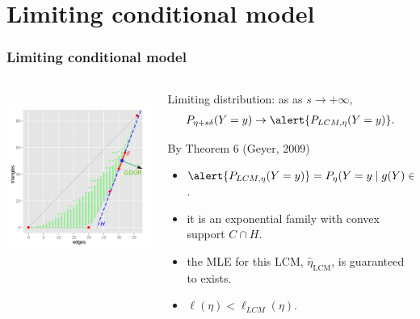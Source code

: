 \documentclass[ 10pt]{beamer}
\newcommand{\etaLCM}{\hat{\eta}_{\textrm{LCM}}}
\begin{document}
\section{Limiting conditional model}
\frame
{
	\frametitle{Limiting conditional model}
\begin{columns}[]
\begin{column}[T]{0.25\textwidth}
\includegraphics[height=2.2in,trim=3.5in 2in 0.15in 0.05in,clip=true]{g9-H.png}
\end{column} %

\begin{column}[t]{0.75\textwidth}
Limiting distribution: as as $s \to +\infty$,
\begin{align*}
P_{\eta + s \delta}( Y = y) \to \alert{P_{LCM, \eta}( Y = y)}.
\end{align*}

\begin{block}{
By Theorem 6 (Geyer, 2009)}
\begin{itemize}
	\item $\alert{P_{LCM, \eta}( Y = y)} = P_{\eta}( Y =y \mid g(Y) \in H)$.
\vspace{1mm}
	
	\item it is an exponential family with convex support $C \cap H$.
\vspace{1mm}

	\item the MLE for this LCM, $\etaLCM$, is guaranteed to exists.
\vspace{1mm}

	\item $\ell(\eta) < \ell_{LCM}(\eta)$.
\end{itemize}
\end{block}

\end{column}
\end{columns}
}
\end{document}
